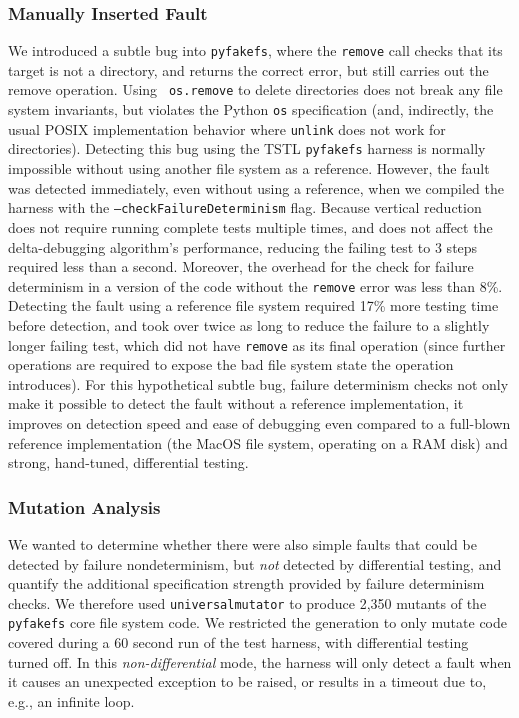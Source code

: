 \subsubsection{Manually Inserted Fault}

We introduced a subtle bug into {\tt pyfakefs}, where the {\tt remove}
call checks that its target is not a directory, and returns the
correct error, but still carries out the remove operation.  Using {\tt
  os.remove} to delete directories does not break any file system
invariants, but violates the Python {\tt os} specification (and,
indirectly, the usual POSIX implementation behavior where {\tt unlink}
does not work for directories).  Detecting this bug using the TSTL
{\tt pyfakefs} harness is normally impossible without using another
file system as a reference.  However, the fault was detected
immediately, even without using a reference, when we compiled the harness
with the {\tt --checkFailureDeterminism} flag.  Because vertical
reduction does not require running complete tests multiple times, and
does not affect the delta-debugging algorithm's performance, reducing
the failing test to 3 steps required less than a second.
Moreover, the overhead for the check for failure determinism in a
version of the code without the {\tt remove} error was
less than 8\%.  Detecting the fault using a reference file system 
required 17\% more testing time before detection, and took over twice as
long to reduce the failure to a
slightly longer failing test, which did not have {\tt remove} as its
final operation (since further operations are required to 
expose the bad file system state the operation introduces).  For this
hypothetical subtle bug, failure determinism checks not only make it
possible to detect the fault without a reference implementation, it
improves on detection speed and ease of debugging even compared to a
full-blown reference implementation (the MacOS file system, operating
on a RAM disk) and strong, hand-tuned, differential testing.

\subsubsection{Mutation Analysis}

We wanted to determine whether there were also simple faults that
could be detected by failure nondeterminism, but \emph{not} detected
by differential testing, and quantify the additional specification
strength provided by failure determinism checks.  We therefore used
{\tt universalmutator} \cite{RegExpMut} to produce 2,350 mutants of
the {\tt pyfakefs} core file system code.   We restricted the generation
to only mutate code covered during a 60 second run of the test
harness, with differential testing turned off.  In this
\emph{non-differential} mode, the harness will only detect a fault when it
causes an unexpected exception to be raised, or results in a timeout
due to, e.g., an infinite loop.

